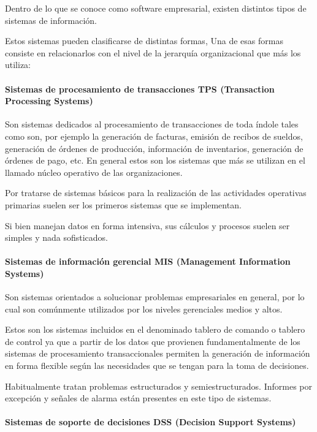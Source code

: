 \documentclass[a4paper, 12pt]{article}
\begin{document}
Dentro de lo que se conoce como software empresarial, existen distintos tipos de sistemas de información.

Estos sistemas pueden clasificarse de distintas formas, Una de esas formas consiste en relacionarlos con el nivel de la jerarquía organizacional que más los utiliza:

\paragraph{Sistemas de procesamiento de transacciones TPS (Transaction Processing Systems)}

Son sistemas dedicados al procesamiento de transacciones de toda índole tales como son, por ejemplo la generación de facturas, emisión de recibos de sueldos, generación de órdenes de producción, información de inventarios, generación de órdenes de pago, etc. En general estos son los sistemas que más se utilizan en el llamado núcleo operativo de las organizaciones.

Por tratarse de sistemas básicos para la realización de las actividades operativas primarias suelen ser los primeros sistemas que se implementan. 

Si bien manejan datos en forma intensiva, sus cálculos y procesos suelen ser simples y nada sofisticados. 

\paragraph{Sistemas de información gerencial MIS (Management Information Systems)}

Son sistemas orientados a solucionar problemas empresariales en general, por lo cual son comúnmente utilizados por los niveles gerenciales medios y altos.

Estos son los sistemas incluidos en el denominado tablero de comando o tablero de control ya que a partir de los datos que provienen fundamentalmente de los sistemas de procesamiento transaccionales permiten la generación de información en forma flexible según las necesidades que se tengan para la toma de decisiones.

Habitualmente tratan problemas estructurados y semiestructurados. Informes por excepción y señales de alarma están presentes en este tipo de sistemas.

\paragraph{Sistemas de soporte de decisiones DSS (Decision Support Systems)}
\end{document}
